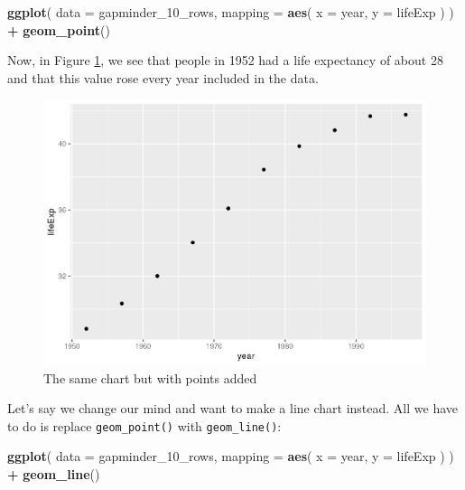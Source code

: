 \documentclass[
]{book}
\newenvironment{Shaded}{\begin{snugshade}}{\end{snugshade}}
\newcommand{\AttributeTok}[1]{\textcolor[rgb]{0.13,0.29,0.53}{#1}}
\newcommand{\FunctionTok}[1]{\textcolor[rgb]{0.13,0.29,0.53}{\textbf{#1}}}
\newcommand{\NormalTok}[1]{#1}
\newcommand{\SpecialCharTok}[1]{\textcolor[rgb]{0.81,0.36,0.00}{\textbf{#1}}}
\begin{document}
\begin{Shaded}
\begin{Highlighting}[]
\FunctionTok{ggplot}\NormalTok{(}
  \AttributeTok{data =}\NormalTok{ gapminder\_10\_rows,}
  \AttributeTok{mapping =} \FunctionTok{aes}\NormalTok{(}
    \AttributeTok{x =}\NormalTok{ year,}
    \AttributeTok{y =}\NormalTok{ lifeExp}
\NormalTok{  )}
\NormalTok{) }\SpecialCharTok{+}
  \FunctionTok{geom\_point}\NormalTok{()}
\end{Highlighting}
\end{Shaded}

Now, in Figure \ref{fig:gapminder-points-plot}, we see that people in 1952 had a life expectancy of about 28 and that this value rose every year included in the data.

\begin{figure}
\includegraphics[width=1\linewidth]{data-viz_files/figure-latex/gapminder-points-plot-1} \caption{The same chart but with points added}\label{fig:gapminder-points-plot}
\end{figure}

Let's say we change our mind and want to make a line chart instead. All we have to do is replace \texttt{geom\_point()} with \texttt{geom\_line()}:

\begin{Shaded}
\begin{Highlighting}[]
\FunctionTok{ggplot}\NormalTok{(}
  \AttributeTok{data =}\NormalTok{ gapminder\_10\_rows,}
  \AttributeTok{mapping =} \FunctionTok{aes}\NormalTok{(}
    \AttributeTok{x =}\NormalTok{ year,}
    \AttributeTok{y =}\NormalTok{ lifeExp}
\NormalTok{  )}
\NormalTok{) }\SpecialCharTok{+}
  \FunctionTok{geom\_line}\NormalTok{()}
\end{Highlighting}
\end{Shaded}
\end{document}
